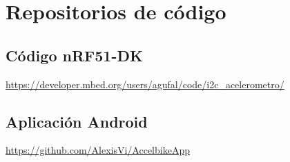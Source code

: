 
\cleardoublepage

\chapter{Repositorios de código}
\label{Appendix:Key1}

\section{Código nRF51-DK}
\url{https://developer.mbed.org/users/agufal/code/i2c_acelerometro/}

\section{Aplicación Android}
\url{https://github.com/AlexisVi/AccelbikeApp}


